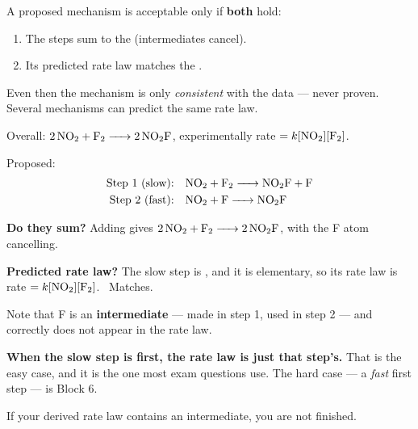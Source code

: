 \documentclass{apchem-notes}
\begin{document}


A proposed mechanism is acceptable only if \textbf{both} hold:

\begin{enumerate}[leftmargin=*,itemsep=0.3em]
  \item The steps sum to the 
        (intermediates cancel).
  \item Its predicted rate law matches the
        .
\end{enumerate}

Even then the mechanism is only \emph{consistent} with the data --- never
proven. Several mechanisms can predict the same rate law.

\begin{workedexample}
Overall: $\ce{2NO2 + F2 -> 2NO2F}$, experimentally
rate $= k[\ce{NO2}][\ce{F2}]$.

Proposed:
\begin{align*}
  \text{Step 1 (slow):} &\quad \ce{NO2 + F2 -> NO2F + F} \\
  \text{Step 2 (fast):} &\quad \ce{NO2 + F -> NO2F}
\end{align*}

\textbf{Do they sum?} Adding gives
$\ce{2NO2 + F2 -> 2NO2F}$, with the F atom cancelling. \checkmark

\textbf{Predicted rate law?} The slow step is
, and it is elementary, so its rate law is
rate $= k[\ce{NO2}][\ce{F2}]$. \checkmark\ Matches.

Note that F is an \textbf{intermediate} --- made in step 1, used in step 2 ---
and correctly does not appear in the rate law.
\end{workedexample}

\begin{apctrap}
\textbf{When the slow step is first, the rate law is just that step's.}
That is the easy case, and it is the one most exam questions use. The hard
case --- a \emph{fast} first step --- is Block 6.

If your derived rate law contains an intermediate, you are not finished.
\end{apctrap}

\end{document}
